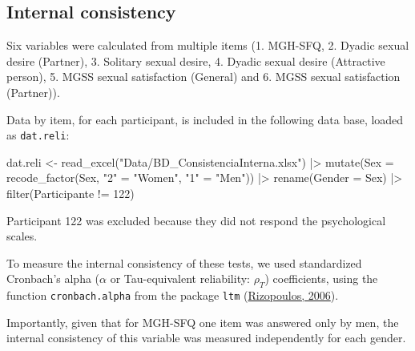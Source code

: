 \documentclass[
  bookmarksnumbered]{article}
\newenvironment{Shaded}{\begin{snugshade}}{\end{snugshade}}
\newcommand{\AttributeTok}[1]{\textcolor[rgb]{0.80,0.80,0.80}{#1}}
\newcommand{\DecValTok}[1]{\textcolor[rgb]{0.86,0.86,0.80}{#1}}
\newcommand{\FunctionTok}[1]{\textcolor[rgb]{0.94,0.94,0.56}{#1}}
\newcommand{\NormalTok}[1]{\textcolor[rgb]{0.80,0.80,0.80}{#1}}
\newcommand{\OtherTok}[1]{\textcolor[rgb]{0.94,0.94,0.56}{#1}}
\newcommand{\SpecialCharTok}[1]{\textcolor[rgb]{0.86,0.64,0.64}{#1}}
\newcommand{\StringTok}[1]{\textcolor[rgb]{0.80,0.58,0.58}{#1}}
\begin{document}
\hypertarget{internal-consistency}{%
\subsection{Internal consistency}\label{internal-consistency}}

Six variables were calculated from multiple items (1. MGH-SFQ, 2. Dyadic sexual desire (Partner), 3. Solitary sexual desire, 4. Dyadic sexual desire (Attractive person), 5. MGSS sexual satisfaction (General) and 6. MGSS sexual satisfaction (Partner)).

Data by item, for each participant, is included in the following data base, loaded as \texttt{dat.reli}:

\begin{Shaded}
\begin{Highlighting}[]
\NormalTok{dat.reli }\OtherTok{\textless{}{-}} \FunctionTok{read\_excel}\NormalTok{(}\StringTok{"Data/BD\_ConsistenciaInterna.xlsx"}\NormalTok{)  }\SpecialCharTok{|\textgreater{}}  
  \FunctionTok{mutate}\NormalTok{(}\AttributeTok{Sex =} \FunctionTok{recode\_factor}\NormalTok{(Sex,}
                             \StringTok{"2"} \OtherTok{=} \StringTok{"Women"}\NormalTok{,}
                             \StringTok{"1"} \OtherTok{=} \StringTok{"Men"}\NormalTok{)) }\SpecialCharTok{|\textgreater{}} 
  \FunctionTok{rename}\NormalTok{(}\AttributeTok{Gender =}\NormalTok{ Sex) }\SpecialCharTok{|\textgreater{}} 
  \FunctionTok{filter}\NormalTok{(Participante }\SpecialCharTok{!=} \DecValTok{122}\NormalTok{)}
\end{Highlighting}
\end{Shaded}

Participant 122 was excluded because they did not respond the psychological scales.

To measure the internal consistency of these tests, we used standardized Cronbach's alpha (\(\alpha\) or Tau-equivalent reliability: \(\rho_{T}\)) coefficients, using the function \texttt{cronbach.alpha} from the package \texttt{ltm} (\protect\hyperlink{ref-LtmPackageLatent2006}{Rizopoulos, 2006}).

Importantly, given that for MGH-SFQ one item was answered only by men, the internal consistency of this variable was measured independently for each gender.
\end{document}
